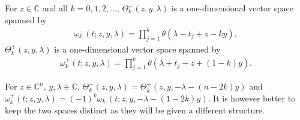 \documentclass[10pt,a4paper]{amsart}
\numberwithin{equation}{section}
\begin{document}
\begin{Example}\label{example-4} For $z\in\mathbb C$ and all $k=0,1,2,\dots$, $\Theta^-_k(z,y,\lambda)$ is a one-dimensional vector space
 spanned by
 \begin{gather*}
 \omega^-_k(t;z,y,\lambda)=\prod_{j=1}^k\theta(\lambda-t_j+z-ky),
 \end{gather*}
 $\Theta^+_k(z,y,\lambda)$ is a one-dimensional vector space spanned by
 \begin{gather*}
 \omega^+_k(t;z,y,\lambda) =\prod_{j=1}^k\theta(\lambda+t_j-z+(1-k)y).
 \end{gather*}
\end{Example}
 \begin{Remark}\label{remark-2} For $z\in\mathbb C^n$, $y,\lambda\in\mathbb C$, $\Theta^-_k(z,y,\lambda)=\Theta^+_k(z,y,-\lambda-(n-2k)y)$ and $\omega^+_k(t;z,y,\lambda)=(-1)^k\omega^-_k(t;z,y,-\lambda-(1-2k)y)$. It is however better to keep the two spaces distinct as they will be given a different structure.
 \end{Remark}
\end{document}
